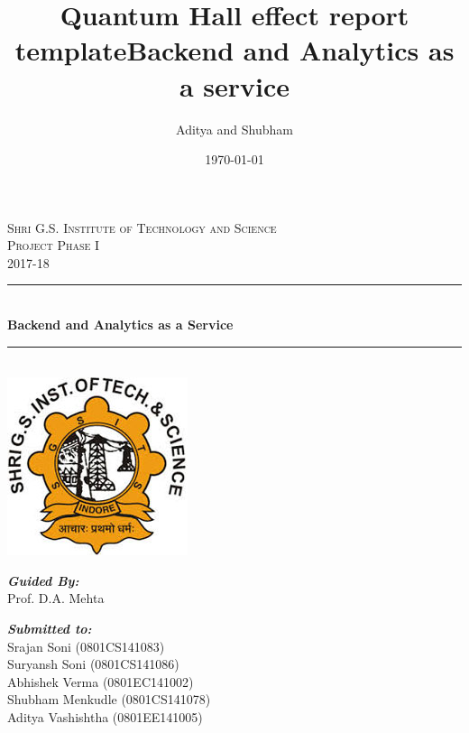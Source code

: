 \documentclass[a4paper,12pt]{report}
\title{Quantum Hall effect report template}
\title{Backend and Analytics as a service}
\author{Aditya and Shubham}
\date{\today}
\begin{document}
    
    \begin{titlepage}
      \newcommand{\HRule}{\rule{\linewidth}{0.5mm}} %
      \center
      \textsc{\LARGE Shri G.S. Institute of Technology and Science}\\[1.5cm]
      \textsc{\Large Project Phase I}\\[0.5cm]
      \textsc{\large 2017-18}\\[0.5cm]
      \HRule \\[0.4cm]
      { \huge \bfseries Backend and Analytics as a Service}\\[0.4cm] %
      \HRule \\[1.5cm]
      \includegraphics{logo.jpg}\\[5cm] %
      \begin{minipage}{0.4\textwidth}
      \begin{flushleft} \large
      \textbf{\emph{Guided By:}}\\
      Prof. D.A. Mehta
      \end{flushleft}
      \end{minipage}
      \begin{minipage}{0.4\textwidth}
      \begin{flushright} \normalsize
      \textbf{\emph{Submitted to:}} \\
      Srajan Soni (0801CS141083)\\
      Suryansh Soni (0801CS141086)\\
      Abhishek Verma (0801EC141002)\\
      Shubham Menkudle (0801CS141078)\\
      Aditya Vashishtha (0801EE141005)\\
      
      
         
      \end{flushright}
      \end{minipage}\\[2cm]            
      \vfill       
    \end{titlepage}    
    
\end{document}
